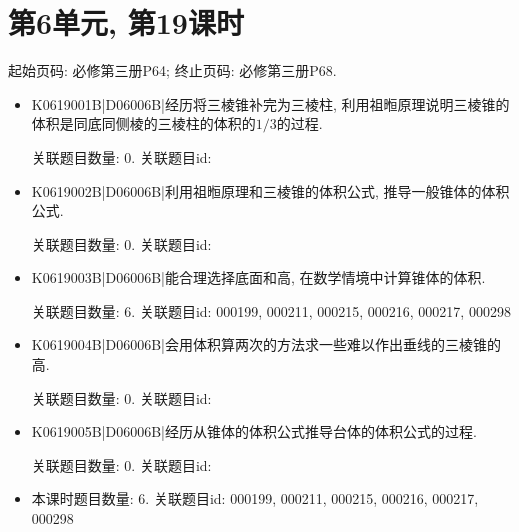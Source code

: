 \section*{第6单元, 第19课时}
起始页码: 必修第三册P64; 终止页码: 必修第三册P68.
\begin{itemize}
\item K0619001B|D06006B|经历将三棱锥补完为三棱柱, 利用祖暅原理说明三棱锥的体积是同底同侧棱的三棱柱的体积的$1/3$的过程.

关联题目数量: 0. 关联题目id: 

\item K0619002B|D06006B|利用祖暅原理和三棱锥的体积公式, 推导一般锥体的体积公式.

关联题目数量: 0. 关联题目id: 

\item K0619003B|D06006B|能合理选择底面和高, 在数学情境中计算锥体的体积.

关联题目数量: 6. 关联题目id: 000199, 000211, 000215, 000216, 000217, 000298

\item K0619004B|D06006B|会用体积算两次的方法求一些难以作出垂线的三棱锥的高.

关联题目数量: 0. 关联题目id: 

\item K0619005B|D06006B|经历从锥体的体积公式推导台体的体积公式的过程.

关联题目数量: 0. 关联题目id: 

\item 本课时题目数量: 6. 关联题目id: 000199, 000211, 000215, 000216, 000217, 000298

\end{itemize}

